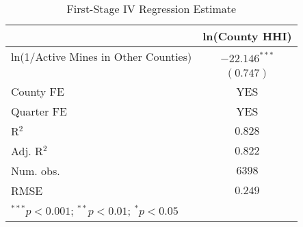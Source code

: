 
\begin{table}
\begin{center}
\begin{tabular}{l c}
\hline
 &  ln(County HHI)  \\
\hline
ln(1/Active Mines in Other Counties) & $-22.146^{***}$ \\
                                     & $(0.747)$       \\
\hline
County FE                            & YES             \\
Quarter FE                           & YES             \\
R$^2$                                & $0.828$         \\
Adj. R$^2$                           & $0.822$         \\
Num. obs.                            & $6398$          \\
RMSE                                 & $0.249$         \\
\hline
\multicolumn{2}{l}{\scriptsize{$^{***}p<0.001$; $^{**}p<0.01$; $^{*}p<0.05$}}
\end{tabular}
\caption{First-Stage IV Regression Estimate}
\label{firststage_table}
\end{center}
\end{table}

